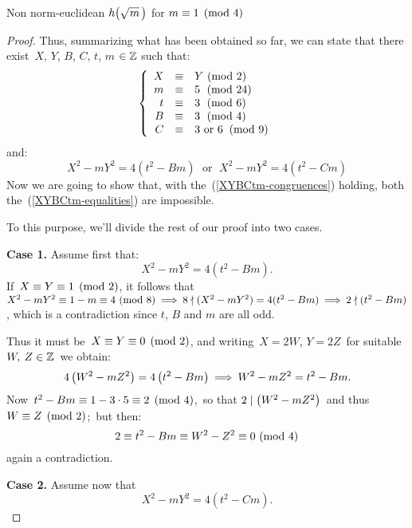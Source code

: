 \begin{subsection}{Non norm-euclidean $\hh{m}$ for $m\equiv 1 \pmod 4$}
\begin{proof}
Thus, summarizing what has been obtained so far, we can state that
there exist\, $X$, $Y$, $B$, $C$, $t$, $m$ $\in \mathbb{Z}$ such that:
\begin{equation}\label{XYBCtm-congruences}
\left\{
  \begin{array}{rcl}
    X & \equiv & Y~(\mathrm{mod}\ 2)  \\
    m & \equiv & 5~\;(\mathrm{mod}\ 24) \\
    t & \equiv & 3~\;(\mathrm{mod}\ 6)  \\
    B & \equiv & 3~\;(\mathrm{mod}\ 4)  \\
    C & \equiv & 3\text{ or }6~\:(\mathrm{mod}\ 9)
  \end{array}
\right.
\end{equation}
and:
\begin{equation}\label{XYBCtm-equalities}
X^2 - m Y^2 = 4(t^2 - B m)
~~\,\text{or}\,~~
X^2 - m Y^2 = 4(t^2 - C m)
\end{equation}
Now we are going to show that, with the~(\ref{XYBCtm-congruences})
holding, both the~(\ref{XYBCtm-equalities}) are impossible.

To this purpose, we'll divide the rest of our proof into two cases.

\medskip
\textbf{Case 1.\:} Assume first that:
\begin{equation}\label{eq-B}
X^2 - m Y^2 = 4(t^2 - B m).
\end{equation}
\smallskip
If\, $X \equiv Y \equiv 1 \pmod2$, it follows that\,
\begin{math}
  X^2 - m Y^2 \equiv 1 - m \equiv 4\ (\mathrm{mod}\ 8) \:\Longrightarrow\:
  8 \nmid (X^2 - m Y^2) = 4 (t^2 - B m) \:\Longrightarrow\:
  2 \nmid (t^2 - B m)
\end{math}, which is a contradiction since $t$, $B$ and $m$ are all odd.

Thus it must be\, $X \equiv Y \equiv 0 \pmod2$, and writing\,
$X = 2W$, $Y = 2Z$\, for suitable \,$W,\:Z\in \mathbb{Z}$\, we obtain:
$$
   4\left(W^2 - m Z^2\right) = 4\left(t^2 - B m\right) \:\Longrightarrow\:
   W^2 - m Z^2 = t^2 - B m.
$$
Now\, $t^2 - Bm \equiv 1 - 3 \cdot 5 \equiv 2 \pmod 4$,\,
so that $2 \mid \left(W^2 -m Z^2\right)$ \,and thus\,
$W \equiv Z \pmod 2$;\, but then:
$$
   2 \equiv t^2 - B m \equiv W^2 - Z^2 \equiv
   0\ (\mathrm{mod}\ 4)
$$
again a contradiction.

\medskip
\textbf{Case 2.\:} Assume now that
\begin{equation}\label{eq-C}
X^2 - m Y^2 = 4(t^2 - C m).
\end{equation}


\end{proof}
\end{subsection}
